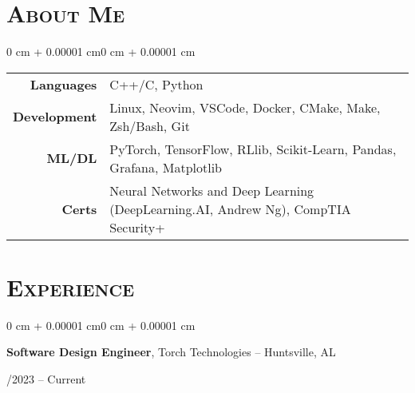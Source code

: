 \documentclass[11pt, letterpaper]{article}
\newenvironment{onecolentry}{
    \begin{adjustwidth}{0 cm + 0.00001 cm}{0 cm + 0.00001 cm}
}{
    \end{adjustwidth}
}
\newenvironment{twocolentry}[1]{
    \onecolentry
    \def\secondColumn{#1}
    \setcolumnwidth{\fill,4.5cm}
    \begin{paracol}{2}
}{
    \switchcolumn \raggedleft \secondColumn
    \end{paracol}
    \endonecolentry
}
\begin{document}
\section{\scshape About Me}

\begin{onecolentry}
\begin{tabular}{@{}r l@{}}
\textbf{Languages} & C++/C, Python \\
\textbf{Development} & Linux, Neovim, VSCode, Docker, CMake, Make, Zsh/Bash, Git \\
\textbf{ML/DL} & PyTorch, TensorFlow, RLlib, Scikit-Learn, Pandas, Grafana, Matplotlib \\
\textbf{Certs} & Neural Networks and Deep Learning (DeepLearning.AI, Andrew Ng), CompTIA Security+ \\
\end{tabular}
\end{onecolentry}


\section{\scshape Experience}

\begin{twocolentry}{05/2023 – Current}
    \textbf{Software Design Engineer}, Torch Technologies -- Huntsville, AL
\end{twocolentry}
\end{document}
